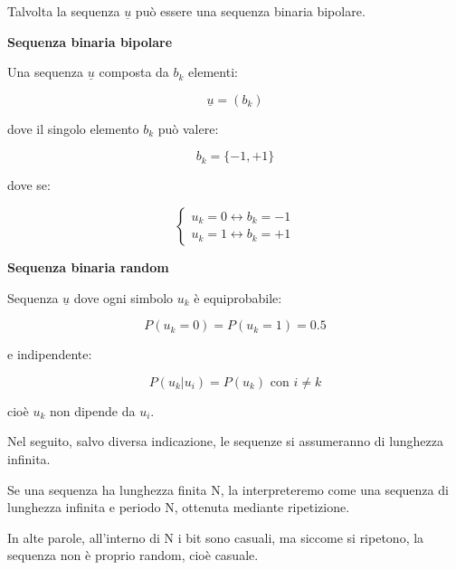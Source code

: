 Talvolta la sequenza $\underline{u}$ può essere una sequenza binaria bipolare. \newline 

\textbf{Sequenza binaria bipolare}

Una sequenza $\underline{u}$ composta da $b_k$ elementi: 

{
    \Large 
    \begin{equation}
        \underline{u} = (b_k)
    \end{equation}

}

dove il singolo elemento $b_k$ può valere:

{
    \Large 
    \begin{equation}
        b_k = \{ -1, +1\}
    \end{equation}
}

dove se: 

{
    \Large 
    \begin{equation}
        \begin{cases}
            u_k = 0 \leftrightarrow b_k = -1 
            \\
            u_k = 1 \leftrightarrow b_k = + 1
        \end{cases}
    \end{equation}
}

\textbf{Sequenza binaria random}

Sequenza $\underline{u}$ dove ogni simbolo $u_k$ è equiprobabile: 

{
    \Large 
    \begin{equation}
        P(u_k = 0) = P (u_k = 1) = 0.5
    \end{equation}
}

e indipendente: 

{
    \Large 
    \begin{equation}
        P(u_k | u_i) = P(u_k) \text{ con } i \neq k
    \end{equation}
}

cioè $u_k$ non dipende da $u_i$. \newline 

\begin{tcolorbox}
    Nel seguito, salvo diversa indicazione, le sequenze si assumeranno di lunghezza infinita. \newline 

    Se una sequenza ha lunghezza finita N, la interpreteremo come una sequenza di lunghezza infinita e periodo N, ottenuta mediante ripetizione. \newline 

    In alte parole, all'interno di N i bit sono casuali, ma siccome si ripetono, la sequenza non è proprio random, cioè casuale. 
\end{tcolorbox}

